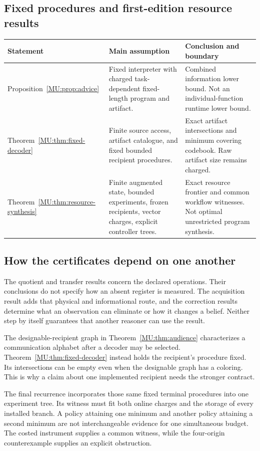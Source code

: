 \documentclass[11pt,oneside,openany]{book}
\numberwithin{equation}{section}
\begin{document}
\subsection{Fixed procedures and first-edition resource results}
\begin{center}\small
\begin{tabularx}{\textwidth}{@{}P{1.35in}P{1.55in}X@{}}\toprule
Statement & Main assumption & Conclusion and boundary\\\midrule
Proposition~\ref{MU:prop:advice} & Fixed interpreter with charged task-dependent fixed-length program and artifact. & Combined information lower bound. Not an individual-function runtime lower bound.\\
Theorem~\ref{MU:thm:fixed-decoder} & Finite source access, artifact catalogue, and fixed bounded recipient procedures. & Exact artifact intersections and minimum covering codebook. Raw artifact size remains charged.\\
Theorem~\ref{MU:thm:resource-synthesis} & Finite augmented state, bounded experiments, frozen recipients, vector charges, explicit controller trees. & Exact resource frontier and common workflow witnesses. Not optimal unrestricted program synthesis.\\\bottomrule
\end{tabularx}\end{center}

\subsection{How the certificates depend on one another}
The quotient and transfer results concern the declared operations. Their conclusions do not specify how an absent register is measured. The acquisition result adds that physical and informational route, and the correction results determine what an observation can eliminate or how it changes a belief. Neither step by itself guarantees that another reasoner can use the result.

The designable-recipient graph in Theorem~\ref{MU:thm:audience} characterizes a communication alphabet after a decoder may be selected. Theorem~\ref{MU:thm:fixed-decoder} instead holds the recipient's procedure fixed. Its intersections can be empty even when the designable graph has a coloring. This is why a claim about one implemented recipient needs the stronger contract.

The final recurrence incorporates those same fixed terminal procedures into one experiment tree. Its witness must fit both online charges and the storage of every installed branch. A policy attaining one minimum and another policy attaining a second minimum are not interchangeable evidence for one simultaneous budget. The costed instrument supplies a common witness, while the four-origin counterexample supplies an explicit obstruction.
\end{document}
